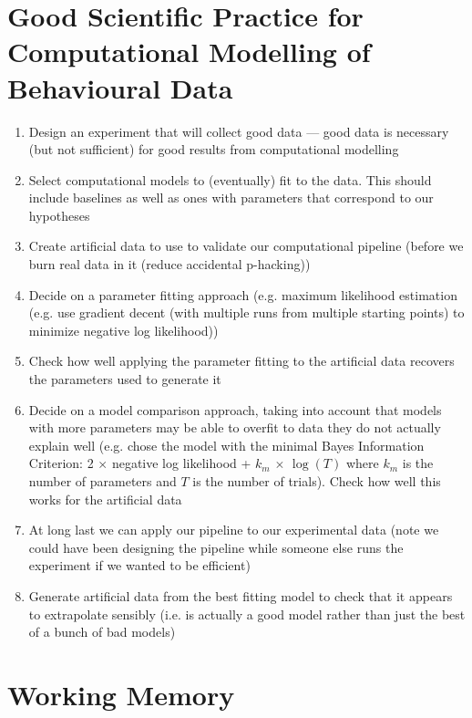 \documentclass[20pt,a4paper,landscape]{extarticle}
\begin{document}
\tableofcontents
\clearpage
\begin{flushleft}
\section{Good Scientific Practice for Computational Modelling of Behavioural Data}
\begin{enumerate}
\item Design an experiment that will collect good data --- good data is necessary (but not sufficient) for good results from computational modelling
\item Select computational models to (eventually) fit to the data. This should include baselines as well as ones with parameters that correspond to our hypotheses
\item Create artificial data to use to validate our computational pipeline (before we burn real data in it (reduce accidental p-hacking))
\item Decide on a parameter fitting approach (e.g. maximum likelihood estimation (e.g. use gradient decent (with multiple runs from multiple starting points) to minimize negative log likelihood))
\item Check how well applying the parameter fitting to the artificial data recovers the parameters used to generate it
\item Decide on a model comparison approach, taking into account that models with more parameters may be able to overfit to data they do not actually explain well (e.g. chose the model with the minimal Bayes Information Criterion: 2 $\times$ negative log likelihood + $k_m$ $\times$ $\log(T)$ where $k_m$ is the number of parameters and $T$ is the number of trials). Check how well this works for the artificial data
\item At long last we can apply our pipeline to our experimental data (note we could have been designing the pipeline while someone else runs the experiment if we wanted to be efficient)
\item Generate artificial data from the best fitting model to check that it appears to extrapolate sensibly (i.e. is actually a good model rather than just the best of a bunch of bad models)
\end{enumerate}
\section{Working Memory}

\end{flushleft}
\end{document}
